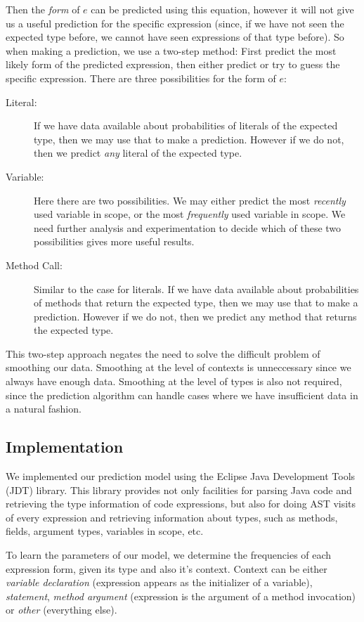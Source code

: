 \documentclass{article} %
\begin{document}
Then the \emph{form} of $e$ can be predicted using this equation, however it will not give us a useful prediction for the specific expression (since, if we have not seen the expected type before, we cannot have seen expressions of that type before). So when making a prediction, we use a two-step method: First predict the most likely form of the predicted expression, then either predict or try to guess the specific expression. There are three possibilities for the form of $e$:
\begin{description}
  \item[Literal:] If we have data available about probabilities of literals of the expected type, then we may use that to make a prediction. However if we do not, then we predict \emph{any} literal of the expected type.
  \item[Variable:] Here there are two possibilities. We may either predict the most \emph{recently} used variable in scope, or the most \emph{frequently} used variable in scope. We need further analysis and experimentation to decide which of these two possibilities gives more useful results.
  \item[Method Call:] Similar to the case for literals. If we have data available about probabilities of methods that return the expected type, then we may use that to make a prediction. However if we do not, then we predict any method that returns the expected type.
\end{description}

This two-step approach negates the need to solve the difficult problem of smoothing our data. Smoothing at the level of contexts is unneccessary since we always have enough data. Smoothing at the level of types is also not required, since the prediction algorithm can handle cases where we have insufficient data in a natural fashion.

\subsection*{Implementation}

We implemented our prediction model using the Eclipse Java Development Tools (JDT) library. This library provides not only facilities for parsing Java code and retrieving the type information of code expressions, but also for doing AST visits of every expression and retrieving information about types, such as methods, fields, argument types, variables in scope, etc.

To learn the parameters of our model, we determine the frequencies of each expression form, given its type and also it's context.
Context can be either \textit{variable declaration} (expression appears as the initializer of a variable), \textit{statement}, \textit{method argument} (expression is the argument of a method invocation) or \textit{other} (everything else).
\end{document}
